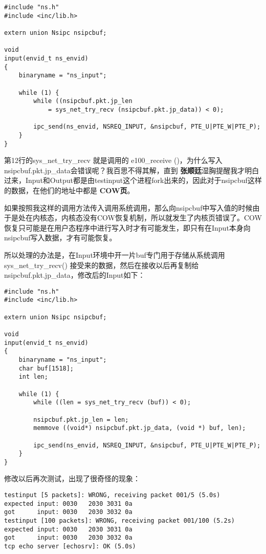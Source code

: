 \documentclass{article}
\newcommand{\highlight}[1]{{\bfseries \color{red}  #1}}
\newcommand{\funcname}[1]{{\ttfamily \small #1}}
\begin{document}
\begin{CJK*}{UTF8}{gkai}
\begin{lstlisting}[style=ccode, title={\scriptsize \ttfamily \bfseries net/input.c}]
#include "ns.h"
#include <inc/lib.h>

extern union Nsipc nsipcbuf;

void
input(envid_t ns_envid)
{
    binaryname = "ns_input";

    while (1) {
        while ((nsipcbuf.pkt.jp_len 
            = sys_net_try_recv (nsipcbuf.pkt.jp_data)) < 0);

        ipc_send(ns_envid, NSREQ_INPUT, &nsipcbuf, PTE_U|PTE_W|PTE_P);     
    }
}
\end{lstlisting}

第12行的sys\_net\_try\_recv 就是调用的 e100\_receive ()，为什么写入 nsipcbuf.pkt.jp\_data会错误呢？我百思不得其解，直到\highlight{张顺廷}湿胸提醒我才明白过来，Input和Output都是由testinput这个进程fork出来的，因此对于nsipcbuf这样的数据，在他们的地址中都是\highlight{COW页}。

如果按照我这样的调用方法传入调用系统调用，那么向nsipcbuf中写入值的时候由于是处在内核态，内核态没有COW恢复机制，所以就发生了内核页错误了。COW恢复只可能是在用户态程序中进行写入时才有可能发生，即只有在Input本身向nsipcbuf写入数据，才有可能恢复。

所以处理的办法是，在Input环境中开一片buf专门用于存储从系统调用 \funcname{ sys\_net\_try\_recv() } 接受来的数据，然后在接收以后再复制给 nsipcbuf.pkt.jp\_data，修改后的Input如下：

\begin{lstlisting}[style=ccode, title={\scriptsize \ttfamily \bfseries net/input.c}]
#include "ns.h"
#include <inc/lib.h>

extern union Nsipc nsipcbuf;

void
input(envid_t ns_envid)
{
    binaryname = "ns_input";
    char buf[1518];
    int len;

    while (1) {
        while ((len = sys_net_try_recv (buf)) < 0);

        nsipcbuf.pkt.jp_len = len;
        memmove ((void*) nsipcbuf.pkt.jp_data, (void *) buf, len);

        ipc_send(ns_envid, NSREQ_INPUT, &nsipcbuf, PTE_U|PTE_W|PTE_P);     
    }
}
\end{lstlisting}

修改以后再次测试，出现了很奇怪的现象：

\begin{lstlisting}[style=console]
testinput [5 packets]: WRONG, receiving packet 001/5 (5.0s)
expected input: 0030   2030 3031 0a
got      input: 0030   2030 3032 0a
testinput [100 packets]: WRONG, receiving packet 001/100 (5.2s)
expected input: 0030   2030 3031 0a
got      input: 0030   2030 3032 0a
tcp echo server [echosrv]: OK (5.0s)
\end{lstlisting}


\end{CJK*}
\end{document}
